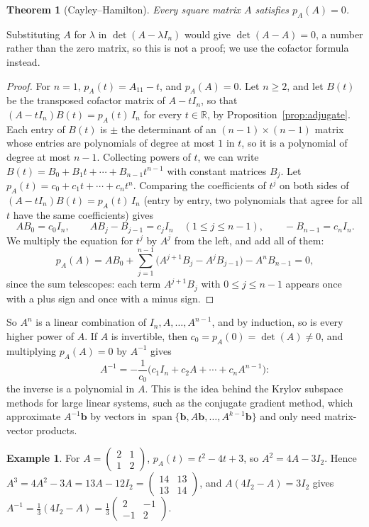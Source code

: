 \documentclass[11pt]{article}
\theoremstyle{definition}
\newtheorem{example}[definition]{Example}
\theoremstyle{plain}
\newtheorem{theorem}[definition]{Theorem}
\theoremstyle{remark}
\DeclareMathOperator{\Span}{span}
\begin{document}
\begin{theorem}[Cayley--Hamilton]\label{thm:cayley-hamilton}
    Every square matrix $A$ satisfies $p_A(A) = 0$.
\end{theorem}

Substituting $A$ for $\lambda$ in $\det(A - \lambda I_n)$ would give $\det(A - A) = 0$, a number rather than the zero matrix, so this is not a proof; we use the cofactor formula instead.

\begin{proof}
    For $n = 1$, $p_A(t) = A_{11} - t$, and $p_A(A) = 0$. Let $n \geq 2$, and let $B(t)$ be the transposed cofactor matrix of $A - tI_n$, so that $(A - tI_n)B(t) = p_A(t)\, I_n$ for every $t \in \mathbb{R}$, by Proposition~\ref{prop:adjugate}. Each entry of $B(t)$ is $\pm$ the determinant of an $(n - 1) \times (n - 1)$ matrix whose entries are polynomials of degree at most $1$ in $t$, so it is a polynomial of degree at most $n - 1$. Collecting powers of $t$, we can write $B(t) = B_0 + B_1t + \cdots + B_{n-1}t^{n-1}$ with constant matrices $B_j$. Let $p_A(t) = c_0 + c_1t + \cdots + c_nt^n$. Comparing the coefficients of $t^j$ on both sides of $(A - tI_n)B(t) = p_A(t)\, I_n$ (entry by entry, two polynomials that agree for all $t$ have the same coefficients) gives
    \[AB_0 = c_0I_n, \qquad AB_j - B_{j-1} = c_jI_n \quad (1 \leq j \leq n - 1), \qquad -B_{n-1} = c_nI_n.\]
    We multiply the equation for $t^j$ by $A^j$ from the left, and add all of them:
    \[p_A(A) = AB_0 + \sum_{j=1}^{n-1}\big(A^{j+1}B_j - A^jB_{j-1}\big) - A^nB_{n-1} = 0,\]
    since the sum telescopes: each term $A^{j+1}B_j$ with $0 \leq j \leq n - 1$ appears once with a plus sign and once with a minus sign.
\end{proof}

So $A^n$ is a linear combination of $I_n, A, \ldots, A^{n-1}$, and by induction, so is every higher power of $A$. If $A$ is invertible, then $c_0 = p_A(0) = \det(A) \neq 0$, and multiplying $p_A(A) = 0$ by $A^{-1}$ gives
\[A^{-1} = -\frac{1}{c_0}\big(c_1I_n + c_2A + \cdots + c_nA^{n-1}\big):\]
the inverse is a polynomial in $A$. This is the idea behind the Krylov subspace methods for large linear systems, such as the conjugate gradient method, which approximate $A^{-1}\mathbf{b}$ by vectors in $\Span\{\mathbf{b}, A\mathbf{b}, \ldots, A^{k-1}\mathbf{b}\}$ and only need matrix-vector products.

\begin{example}\label{ex:cayley-hamilton}
    For $A = \begin{pmatrix} 2 & 1 \\ 1 & 2 \end{pmatrix}$, $p_A(t) = t^2 - 4t + 3$, so $A^2 = 4A - 3I_2$. Hence $A^3 = 4A^2 - 3A = 13A - 12I_2 = \begin{pmatrix} 14 & 13 \\ 13 & 14 \end{pmatrix}$, and $A(4I_2 - A) = 3I_2$ gives $A^{-1} = \frac{1}{3}(4I_2 - A) = \frac{1}{3}\begin{pmatrix} 2 & -1 \\ -1 & 2 \end{pmatrix}$.
\end{example}
\end{document}
